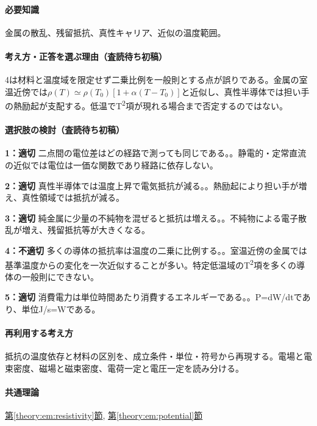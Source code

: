 \paragraph{必要知識} 金属の散乱、残留抵抗、真性キャリア、近似の温度範囲。

\paragraph{考え方・正答を選ぶ理由（査読待ち初稿）} 4は材料と温度域を限定せず二乗比例を一般則とする点が誤りである。金属の室温近傍では\(\rho(T)\simeq\rho(T_0)[1+\alpha(T-T_0)]\)と近似し、真性半導体では担い手の熱励起が支配する。低温でT\textsuperscript{2}項が現れる場合まで否定するのではない。

\paragraph{選択肢の検討（査読待ち初稿）}\mbox{}\par

\noindent\textbf{1：適切} 二点間の電位差はどの経路で測っても同じである。。静電的・定常直流の近似では電位は一価な関数であり経路に依存しない。\par

\noindent\textbf{2：適切} 真性半導体では温度上昇で電気抵抗が減る。。熱励起により担い手が増え、真性領域では抵抗が減る。\par

\noindent\textbf{3：適切} 純金属に少量の不純物を混ぜると抵抗は増える。。不純物による電子散乱が増え、残留抵抗等が大きくなる。\par

\noindent\textbf{4：不適切} 多くの導体の抵抗率は温度の二乗に比例する。。室温近傍の金属では基準温度からの変化を一次近似することが多い。特定低温域のT\textsuperscript{2}項を多くの導体の一般則にできない。\par

\noindent\textbf{5：適切} 消費電力は単位時間あたり消費するエネルギーである。。P=\allowbreak{}dW/dtであり、単位J/s=\allowbreak{}Wである。\par

\paragraph{再利用する考え方} 抵抗の温度依存と材料の区別を、成立条件・単位・符号から再現する。電場と電束密度、磁場と磁束密度、電荷一定と電圧一定を読み分ける。

\paragraph{共通理論} \hyperref[theory:em:resistivity]{第\ref*{theory:em:resistivity}節}, \hyperref[theory:em:potential]{第\ref*{theory:em:potential}節}

